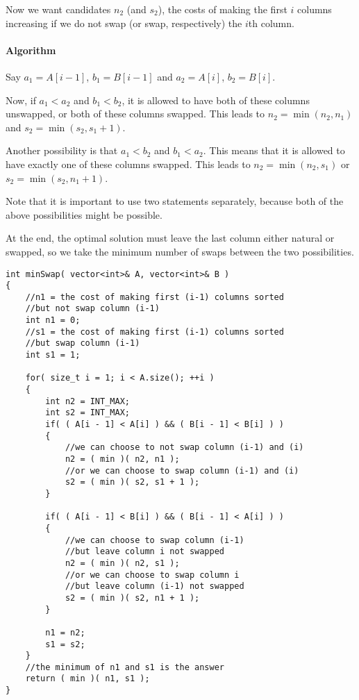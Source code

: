 Now we want candidates $n_2$ (and $s_2$), the costs of making the first $i$ columns increasing if we do not swap (or swap, respectively) the $i$th column.

\paragraph{Algorithm}

Say $a_1 = A[i-1]$, $b_1 = B[i-1]$ and $a_2 = A[i]$, $b_2 = B[i]$.

Now, if $a_1 < a_2$ and $b_1 < b_2$, it is allowed to have both of these columns unswapped, or both of these columns swapped. This leads to $n_2 = \min(n_2, n_1)$ and $s_2 = \min(s_2, s_1 + 1)$.

Another possibility is that $ a_1 < b_2 $ and $ b_1 < a_2 $. This means that it is allowed to have exactly one of these columns swapped. This leads to $n_2 = \min(n_2, s_1)$ or $s_2 = \min(s_2, n_1 + 1)$.

Note that it is important to use two  statements separately, because both of the above possibilities might be possible.

At the end, the optimal solution must leave the last column either natural or swapped, so we take the minimum number of swaps between the two possibilities.


\setcounter{lstlisting}{0}
\begin{lstlisting}[style=customc, caption={Dynamic Programming}]
int minSwap( vector<int>& A, vector<int>& B )
{
    //n1 = the cost of making first (i-1) columns sorted
    //but not swap column (i-1)
    int n1 = 0;
    //s1 = the cost of making first (i-1) columns sorted
    //but swap column (i-1)
    int s1 = 1;

    for( size_t i = 1; i < A.size(); ++i )
    {
        int n2 = INT_MAX;
        int s2 = INT_MAX;
        if( ( A[i - 1] < A[i] ) && ( B[i - 1] < B[i] ) )
        {
            //we can choose to not swap column (i-1) and (i)
            n2 = ( min )( n2, n1 );
            //or we can choose to swap column (i-1) and (i)
            s2 = ( min )( s2, s1 + 1 );
        }

        if( ( A[i - 1] < B[i] ) && ( B[i - 1] < A[i] ) )
        {
            //we can choose to swap column (i-1)
            //but leave column i not swapped
            n2 = ( min )( n2, s1 );
            //or we can choose to swap column i
            //but leave column (i-1) not swapped
            s2 = ( min )( s2, n1 + 1 );
        }

        n1 = n2;
        s1 = s2;
    }
    //the minimum of n1 and s1 is the answer
    return ( min )( n1, s1 );
}
\end{lstlisting}
